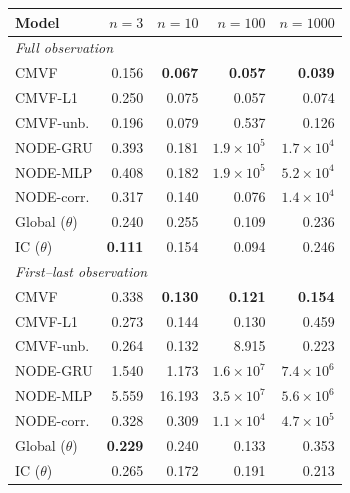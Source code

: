 \begin{tabular}{lrrrr}
\toprule
Model & $n{=}3$ & $n{=}10$ & $n{=}100$ & $n{=}1000$ \\
\midrule
\multicolumn{5}{l}{\emph{Full observation}} \\
CMVF & 0.156 & \textbf{0.067} & \textbf{0.057} & \textbf{0.039} \\
CMVF-L1 & 0.250 & 0.075 & 0.057 & 0.074 \\
CMVF-unb. & 0.196 & 0.079 & 0.537 & 0.126 \\
NODE-GRU & 0.393 & 0.181 & $1.9\!\times\!10^{5}$ & $1.7\!\times\!10^{4}$ \\
NODE-MLP & 0.408 & 0.182 & $1.9\!\times\!10^{5}$ & $5.2\!\times\!10^{4}$ \\
NODE-corr. & 0.317 & 0.140 & 0.076 & $1.4\!\times\!10^{4}$ \\
Global ($\theta$) & 0.240 & 0.255 & 0.109 & 0.236 \\
IC ($\theta$) & \textbf{0.111} & 0.154 & 0.094 & 0.246 \\
\midrule
\multicolumn{5}{l}{\emph{First--last observation}} \\
CMVF & 0.338 & \textbf{0.130} & \textbf{0.121} & \textbf{0.154} \\
CMVF-L1 & 0.273 & 0.144 & 0.130 & 0.459 \\
CMVF-unb. & 0.264 & 0.132 & 8.915 & 0.223 \\
NODE-GRU & 1.540 & 1.173 & $1.6\!\times\!10^{7}$ & $7.4\!\times\!10^{6}$ \\
NODE-MLP & 5.559 & 16.193 & $3.5\!\times\!10^{7}$ & $5.6\!\times\!10^{6}$ \\
NODE-corr. & 0.328 & 0.309 & $1.1\!\times\!10^{4}$ & $4.7\!\times\!10^{5}$ \\
Global ($\theta$) & \textbf{0.229} & 0.240 & 0.133 & 0.353 \\
IC ($\theta$) & 0.265 & 0.172 & 0.191 & 0.213 \\
\bottomrule
\end{tabular}
